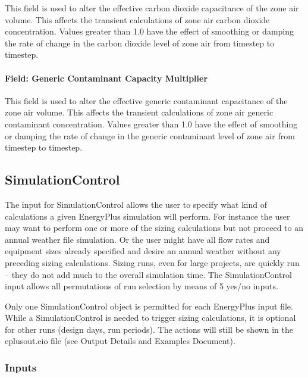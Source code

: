 This field is used to alter the effective carbon dioxide capacitance of the zone air volume. This affects the transient calculations of zone air carbon dioxide concentration. Values greater than 1.0 have the effect of smoothing or damping the rate of change in the carbon dioxide level of zone air from timestep to timestep.

\paragraph{Field: Generic Contaminant Capacity Multiplier}\label{field-generic-contaminant-capacity-multiplier}

This field is used to alter the effective generic contaminant capacitance of the zone air volume. This affects the transient calculations of zone air generic contaminant concentration. Values greater than 1.0 have the effect of smoothing or damping the rate of change in the generic contaminant level of zone air from timestep to timestep.

\subsection{SimulationControl}\label{simulationcontrol}

The input for SimulationControl allows the user to specify what kind of calculations a given EnergyPlus simulation will perform. For instance the user may want to perform one or more of the sizing calculations but not proceed to an annual weather file simulation. Or the user might have all flow rates and equipment sizes already specified and desire an annual weather without any preceding sizing calculations. Sizing runs, even for large projects, are quickly run -- they do not add much to the overall simulation time. The SimulationControl input allows all permutations of run selection by means of 5 yes/no inputs.

\begin{callout}
Only one SimulationControl object is permitted for each EnergyPlus input file. While a SimulationControl is needed to trigger sizing calculations, it is optional for other runs (design days, run periods). The actions will still be shown in the eplusout.eio file (see Output Details and Examples Document).
\end{callout}

\subsubsection{Inputs}\label{inputs-15-014}

